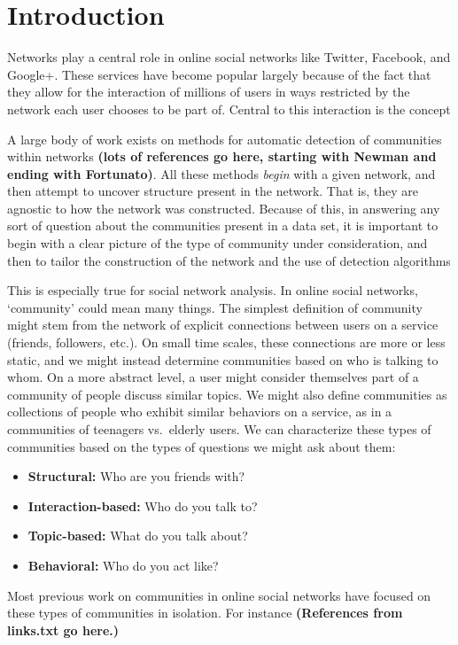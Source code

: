 \section{Introduction}

Networks play a central role in online social networks like Twitter, Facebook, and Google+. These services have become popular largely because of the fact that they allow for the interaction of millions of users in ways restricted by the network each user chooses to be part of. Central to this interaction is the concept 

A large body of work exists on methods for automatic detection of communities within networks \textbf{(lots of references go here, starting with Newman and ending with Fortunato)}. All these methods \emph{begin} with a given network, and then attempt to uncover structure present in the network. That is, they are agnostic to how the network was constructed. Because of this, in answering any sort of question about the communities present in a data set, it is important to begin with a clear picture of the type of community under consideration, and then to tailor the construction of the network and the use of detection algorithms 

This is especially true for social network analysis. In online social networks, `community' could mean many things. The simplest definition of community might stem from the network of explicit connections between users on a service (friends, followers, etc.). On small time scales, these connections are more or less static, and we might instead determine communities based on who is talking to whom. On a more abstract level, a user might consider themselves part of a community of people discuss similar topics. We might also define communities as collections of people who exhibit similar behaviors on a service, as in a communities of teenagers vs.\ elderly users. We can characterize these types of communities based on the types of questions we might ask about them:
\begin{itemize}
	\item \textbf{Structural:} Who are you friends with?
	\item \textbf{Interaction-based:} Who do you talk to?
	\item \textbf{Topic-based:} What do you talk about?
	\item \textbf{Behavioral:}  Who do you act like?
\end{itemize}

Most previous work on communities in online social networks have focused on these types of communities in isolation. For instance \textbf{(References from links.txt go here.)}

